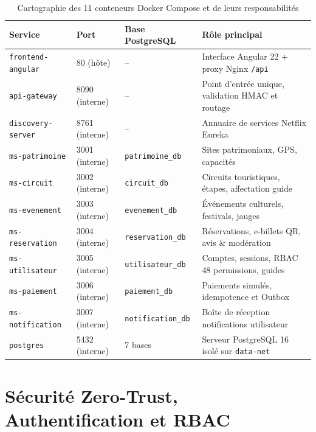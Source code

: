 \documentclass[12pt,a4paper]{report}
\begin{document}
\begin{table}[H]
\centering
\caption{Cartographie des 11 conteneurs Docker Compose et de leurs responsabilités}
\label{tab:services-mapping}
\small
\begin{tabularx}{\textwidth}{@{}l l l X@{}}
\toprule
\textbf{Service} & \textbf{Port} & \textbf{Base PostgreSQL} & \textbf{Rôle principal} \\
\midrule
\texttt{frontend-angular} & 80 (hôte) & -- & Interface Angular 22 + proxy Nginx \texttt{/api} \\
\texttt{api-gateway} & 8090 (interne) & -- & Point d'entrée unique, validation HMAC et routage \\
\texttt{discovery-server} & 8761 (interne) & -- & Annuaire de services Netflix Eureka \\
\texttt{ms-patrimoine} & 3001 (interne) & \texttt{patrimoine\_db} & Sites patrimoniaux, GPS, capacités \\
\texttt{ms-circuit} & 3002 (interne) & \texttt{circuit\_db} & Circuits touristiques, étapes, affectation guide \\
\texttt{ms-evenement} & 3003 (interne) & \texttt{evenement\_db} & Événements culturels, festivals, jauges \\
\texttt{ms-reservation} & 3004 (interne) & \texttt{reservation\_db} & Réservations, e-billets QR, avis \& modération \\
\texttt{ms-utilisateur} & 3005 (interne) & \texttt{utilisateur\_db} & Comptes, sessions, RBAC 48 permissions, guides \\
\texttt{ms-paiement} & 3006 (interne) & \texttt{paiement\_db} & Paiements simulés, idempotence et Outbox \\
\texttt{ms-notification} & 3007 (interne) & \texttt{notification\_db} & Boîte de réception notifications utilisateur \\
\texttt{postgres} & 5432 (interne) & 7 bases & Serveur PostgreSQL 16 isolé sur \texttt{data-net} \\
\bottomrule
\end{tabularx}
\end{table}

\chapter{Sécurité Zero-Trust, Authentification et RBAC}
\end{document}
